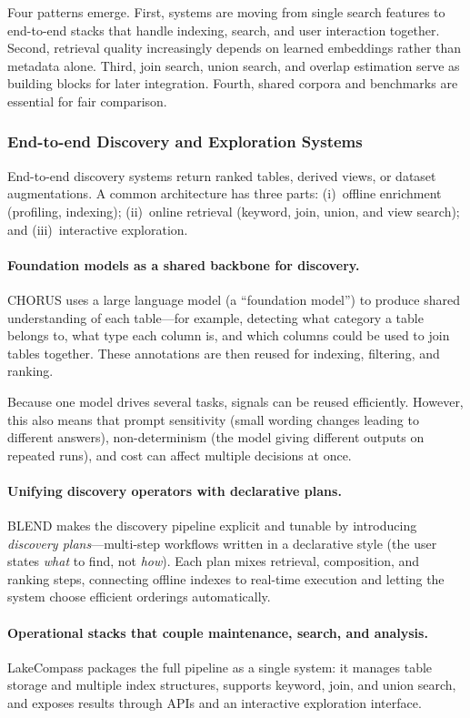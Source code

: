 \documentclass[sigconf]{acmart}
\begin{document}
Four patterns emerge. First, systems are moving from single search features to end-to-end stacks that handle indexing, search, and user interaction together. Second, retrieval quality increasingly depends on learned embeddings rather than metadata alone. Third, join search, union search, and overlap estimation serve as building blocks for later integration. Fourth, shared corpora and benchmarks are essential for fair comparison.

\subsubsection{End-to-end Discovery and Exploration Systems}
End-to-end discovery systems return ranked tables, derived views, or dataset augmentations. A common architecture has three parts: (i)~offline enrichment (profiling, indexing); (ii)~online retrieval (keyword, join, union, and view search); and (iii)~interactive exploration.

\paragraph{Foundation models as a shared backbone for discovery.}
CHORUS uses a large language model (a ``foundation model'') to produce shared understanding of each table---for example, detecting what category a table belongs to, what type each column is, and which columns could be used to join tables together. These annotations are then reused for indexing, filtering, and ranking.

Because one model drives several tasks, signals can be reused efficiently. However, this also means that prompt sensitivity (small wording changes leading to different answers), non-determinism (the model giving different outputs on repeated runs), and cost can affect multiple decisions at once.

\paragraph{Unifying discovery operators with declarative plans.}
BLEND makes the discovery pipeline explicit and tunable by introducing \emph{discovery plans}---multi-step workflows written in a declarative style (the user states \emph{what} to find, not \emph{how}). Each plan mixes retrieval, composition, and ranking steps, connecting offline indexes to real-time execution and letting the system choose efficient orderings automatically.

\paragraph{Operational stacks that couple maintenance, search, and analysis.}
LakeCompass packages the full pipeline as a single system: it manages table storage and multiple index structures, supports keyword, join, and union search, and exposes results through APIs and an interactive exploration interface.
\end{document}
